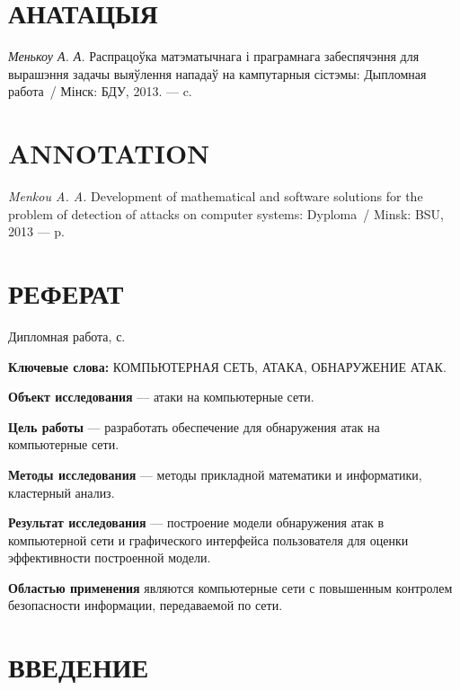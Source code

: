 \medskip


\section*{АНАТАЦЫЯ}

\textit{Менькоу А. А.} Распрацоўка матэматычнага і праграмнага забеспячэння для вырашэння задачы выяўлення нападаў на кампутарныя сістэмы: Дыпломная работа~/ Мінск: 
БДУ, 2013. --- \pagescount c.

\medskip


\section*{ANNOTATION}

\textit{Menkou A. A.} Development of mathematical and software solutions for the problem of detection of attacks on computer systems:
Dyploma~/ Minsk: BSU, 2013 --- \pagescount p.

\medskip

\newpage

\section*{РЕФЕРАТ}

Дипломная работа, \pagescount с.

\medskip
\textbf{Ключевые слова:} КОМПЬЮТЕРНАЯ СЕТЬ, АТАКА, ОБНАРУЖЕНИЕ АТАК.

\medskip
\textbf{Объект исследования} --- атаки на компьютерные сети.

\textbf{Цель работы} --- разработать обеспечение для обнаружения атак на компьютерные сети.

\textbf{Методы исследования} --- методы прикладной математики и информатики, 
кластерный анализ.

\textbf{Результат исследования} --- построение модели обнаружения атак в компьютерной сети и графического интерфейса пользователя для оценки эффективности построенной модели.

\textbf{Областью применения} являются компьютерные сети с повышенным контролем безопасности информации, передаваемой по сети.

\newpage

\renewcommand{\contentsname}{СОДЕРЖАНИЕ}
\tableofcontents

\newpage

\section*{ВВЕДЕНИЕ}

